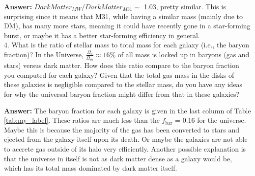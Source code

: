 \documentclass[12pt]{article}
\begin{document}
\textbf{Answer:} $Dark Matter_{MW}/Dark Matter_{M31} \sim$ 1.03, pretty similar. This is surprising since it means that M31, while having a similar mass (mainly due to DM), has many more stars, meaning it could have recently gone in a star-forming burst, or maybe it has a better star-forming efficiency in general. 
\\

4. What is the ratio of stellar mass to total mass for each galaxy (i.e., the baryon fraction)? In the Universe, $\frac{\Omega_b}{\Omega_m} \approx 16\%$ of all mass is locked up in baryons (gas and stars) versus dark matter. How does this ratio compare to the baryon fraction you computed for each galaxy? Given that the total gas mass in the disks of these galaxies is negligible compared to the stellar mass, do you have any ideas for why the universal baryon fraction might differ from that in these galaxies?

\textbf{Answer:} The baryon fraction for each galaxy is given in the last column of Table \ref{tab:my_label}. These ratios are much less than the $f_\text{bar}$ = 0.16 for the universe. Maybe this is because the majority of the gas has been converted to stars and ejected from the galaxy itself upon its death. Or maybe the galaxies are not able to accrete gas outside of its halo very efficiently. Another possible explanation is that the universe in itself is not as dark matter dense as a galaxy would be, which has its total mass dominated by dark matter itself.
\end{document}

